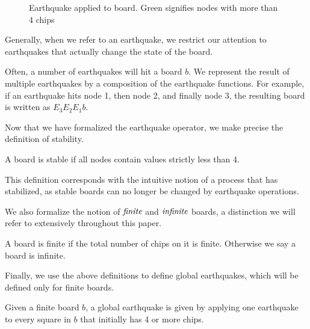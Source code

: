 \documentclass[runningheads,a4paper]{llncs}
\begin{document}
\begin{figure}
\centering
{}
\qquad\qquad
{}
\caption{Earthquake applied to board. Green signifies nodes with more than 4 chips}
\label{fig:earthquakeexample}
\end{figure}

Generally, when we refer to an earthquake, we restrict our attention to earthquakes that actually change the state of the board. 

Often, a number of earthquakes will hit a board $b$. We represent the result of multiple earthquakes by a composition of the earthquake functions. For example, if an earthquake hits node 1, then node 2, and finally node 3, the resulting board is written as $E_3E_2E_1b$.

Now that we have formalized the earthquake operator, we make precise the definition of stability.
\begin{definition}
A board is stable if all nodes contain values strictly less than 4. 
\end{definition}
This definition corresponds with the intuitive notion of a process that has stabilized, as stable boards can no longer be changed by earthquake operations.

We also formalize the notion of $\emph{finite}$ and $\emph{infinite}$ boards, a distinction we will refer to extensively throughout this paper.

\begin{definition} 
A board is finite if the total number of chips on it is finite. Otherwise we say a board is infinite. 
\end{definition}

Finally, we use the above definitions to define global earthquakes, which will be defined only for finite boards. 
\begin{definition}
Given a finite board $b$, a global earthquake is given by applying one earthquake to every square in $b$ that initially has 4 or more chips.
\end{definition}
\end{document}
